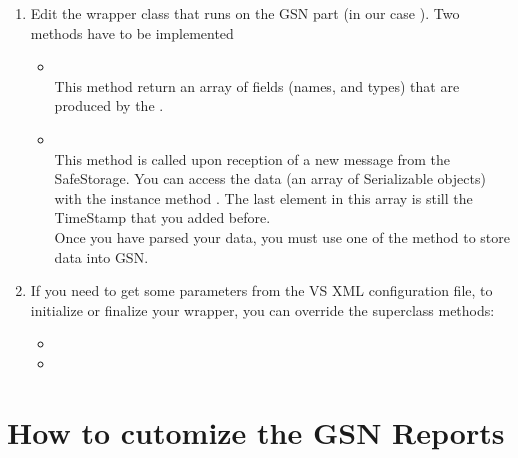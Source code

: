 \begin{enumerate}
	\item Edit the wrapper class that runs on the GSN part (in our case ).
	Two methods have to be implemented

	\begin{itemize}
		\item {} \\
		This method return an array of fields (names, and types) that are produced by the \wrapper.

		\item {} \\
		This method is called upon reception of a new message from the SafeStorage.
		You can access the data (an array of Serializable objects) with the instance method .
		The last element in this array is still the TimeStamp that you added before.\\ %
		Once you have parsed your data, you must use one of the  method to store data into GSN.
%
%	
	\end{itemize}

	\item If you need to get some parameters from the VS XML configuration file, to initialize or finalize your wrapper, you can override 
	the superclass methods:

	\begin{itemize}
		\item {}
		\item {}
	\end{itemize}
\end{enumerate}

\section{How to cutomize the GSN Reports}